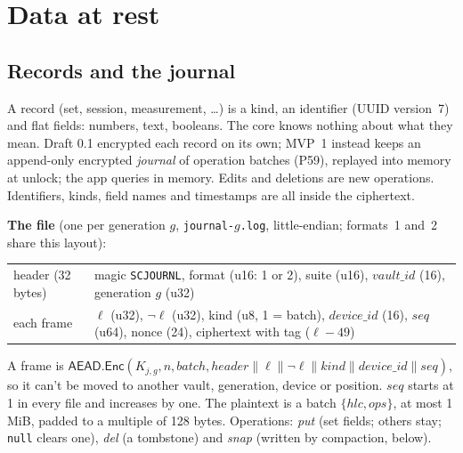 \documentclass[11pt,a4paper]{article}
\newcommand{\concat}{\mathbin{\|}}
\newcommand{\AEAD}{\mathsf{AEAD}}
\newcommand{\Enc}{\mathsf{Enc}}
\newcommand{\dref}[1]{\textsf{#1}} %
\begin{document}
\section{Data at rest}
\label{sec:rest}

\subsection{Records and the journal}
\label{sec:journal}
A record (set, session, measurement, \ldots) is a kind, an identifier (UUID version~7) and flat fields: numbers, text, booleans. The core knows nothing about what they mean. Draft 0.1 encrypted each record on its own; MVP~1 instead keeps an append-only encrypted \emph{journal} of operation batches (\dref{P59}), replayed into memory at unlock; the app queries in memory. Edits and deletions are new operations. Identifiers, kinds, field names and timestamps are all inside the ciphertext.

\noindent\textbf{The file} (one per generation $g$, \texttt{journal-}$g$\texttt{.log}, little-endian; formats~1 and~2 share this layout):
\begin{center}\small
\begin{tabularx}{\textwidth}{@{}lX@{}}
\toprule
header (32 bytes) & magic \texttt{SCJOURNL}, format (u16: 1 or 2), suite (u16), $\mathit{vault\_id}$ (16), generation $g$ (u32) \\
each frame & $\ell$ (u32), $\lnot\ell$ (u32), kind (u8, 1 = batch), $\mathit{device\_id}$ (16), $\mathit{seq}$ (u64), nonce (24), ciphertext with tag ($\ell - 49$) \\
\bottomrule
\end{tabularx}
\end{center}
A frame is $\AEAD.\Enc(K_{j,g}, n, \mathit{batch}, \mathit{header} \concat \ell \concat \lnot\ell \concat \mathit{kind} \concat \mathit{device\_id} \concat \mathit{seq})$, so it can't be moved to another vault, generation, device or position. $\mathit{seq}$ starts at 1 in every file and increases by one. The plaintext is a batch $\{\mathit{hlc}, \mathit{ops}\}$, at most 1\,MiB, padded to a multiple of 128 bytes. Operations: \emph{put} (set fields; others stay; \texttt{null} clears one), \emph{del} (a tombstone) and \emph{snap} (written by compaction, below).
\end{document}
